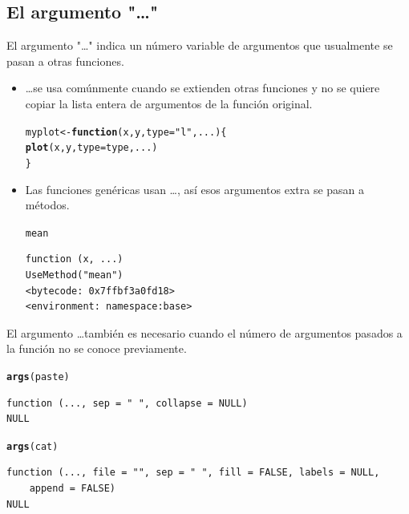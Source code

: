 \documentclass{article}\usepackage[]{graphicx}\usepackage[]{color}
\makeatletter
\newcommand{\hlstr}[1]{\textcolor[rgb]{0.192,0.494,0.8}{#1}}%
\newcommand{\hlstd}[1]{\textcolor[rgb]{0.345,0.345,0.345}{#1}}%
\newcommand{\hlkwa}[1]{\textcolor[rgb]{0.161,0.373,0.58}{\textbf{#1}}}%
\newcommand{\hlkwb}[1]{\textcolor[rgb]{0.69,0.353,0.396}{#1}}%
\newcommand{\hlkwc}[1]{\textcolor[rgb]{0.333,0.667,0.333}{#1}}%
\newcommand{\hlkwd}[1]{\textcolor[rgb]{0.737,0.353,0.396}{\textbf{#1}}}%
\newenvironment{kframe}{%
 \def\at@end@of@kframe{}%
 \ifinner\ifhmode%
  \def\at@end@of@kframe{\end{minipage}}%
  \begin{minipage}{\columnwidth}%
 \fi\fi%
 \def\FrameCommand##1{\hskip\@totalleftmargin \hskip-\fboxsep
 \colorbox{shadecolor}{##1}\hskip-\fboxsep
     \hskip-\linewidth \hskip-\@totalleftmargin \hskip\columnwidth}%
 \MakeFramed {\advance\hsize-\width
   \@totalleftmargin\z@ \linewidth\hsize
   \@setminipage}}%
 {\par\unskip\endMakeFramed%
 \at@end@of@kframe}
\newenvironment{knitrout}{}{} %
\makeatother
\begin{document}
  \subsection{El argumento "\dots"}
  El argumento "\dots" indica un número variable de argumentos que usualmente se pasan a otras funciones.
  \begin{itemize}
    \item \dots se usa comúnmente cuando se extienden otras funciones y no se quiere copiar la lista entera de argumentos de la función original.
\begin{knitrout}
\color{fgcolor}\begin{kframe}
\begin{alltt}
  \hlstd{myplot} \hlkwb{<-} \hlkwa{function}\hlstd{(}\hlkwc{x}\hlstd{,} \hlkwc{y}\hlstd{,} \hlkwc{type} \hlstd{=} \hlstr{"l"}\hlstd{,} \hlkwc{...}\hlstd{)\{}
    \hlkwd{plot}\hlstd{(x, y,} \hlkwc{type} \hlstd{= type, ...)}
  \hlstd{\}}
\end{alltt}
\end{kframe}
\end{knitrout}
    \item Las funciones genéricas usan \dots, así esos argumentos extra se pasan a métodos.
\begin{knitrout}
\color{fgcolor}\begin{kframe}
\begin{alltt}
  \hlstd{mean}
\end{alltt}
\begin{verbatim}
function (x, ...) 
UseMethod("mean")
<bytecode: 0x7ffbf3a0fd18>
<environment: namespace:base>
\end{verbatim}
\end{kframe}
\end{knitrout}
  \end{itemize}

  El argumento \dots también es necesario cuando el número de argumentos pasados a la función no se conoce previamente.
\begin{knitrout}
\color{fgcolor}\begin{kframe}
\begin{alltt}
  \hlkwd{args}\hlstd{(paste)}
\end{alltt}
\begin{verbatim}
function (..., sep = " ", collapse = NULL) 
NULL
\end{verbatim}
\begin{alltt}
  \hlkwd{args}\hlstd{(cat)}
\end{alltt}
\begin{verbatim}
function (..., file = "", sep = " ", fill = FALSE, labels = NULL, 
    append = FALSE) 
NULL
\end{verbatim}
\end{kframe}
\end{knitrout}
  
\end{document}
